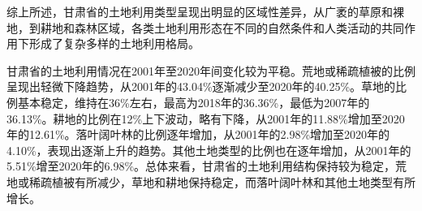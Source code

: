 \documentclass{article}
\begin{document}
	
		综上所述，甘肃省的土地利用类型呈现出明显的区域性差异，从广袤的草原和裸地，到耕地和森林区域，各类土地利用形态在不同的自然条件和人类活动的共同作用下形成了复杂多样的土地利用格局。
		
		
		
		甘肃省的土地利用情况在2001年至2020年间变化较为平稳。荒地或稀疏植被的比例呈现出轻微下降趋势，从2001年的43.04\%逐渐减少至2020年的40.25\%。草地的比例基本稳定，维持在36\%左右，最高为2018年的36.36\%，最低为2007年的36.13\%。耕地的比例在12\%上下波动，略有下降，从2001年的11.88\%增加至2020年的12.61\%。落叶阔叶林的比例逐年增加，从2001年的2.98\%增加至2020年的4.10\%，表现出逐渐上升的趋势。其他土地类型的比例也在逐年增加，从2001年的5.51\%增至2020年的6.98\%。总体来看，甘肃省的土地利用结构保持较为稳定，荒地或稀疏植被有所减少，草地和耕地保持稳定，而落叶阔叶林和其他土地类型有所增长。
		
\end{document}
